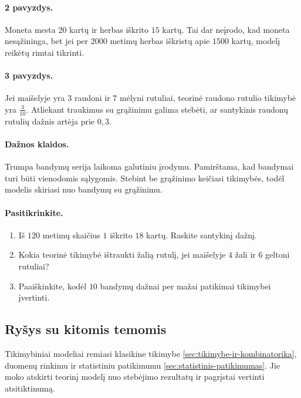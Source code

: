 \paragraph{2 pavyzdys.}
Moneta mesta $20$ kartų ir herbas iškrito $15$ kartų. Tai dar neįrodo, kad moneta nesąžininga, bet jei per $2000$ metimų herbas iškristų apie $1500$ kartų, modelį reikėtų rimtai tikrinti.

\paragraph{3 pavyzdys.}
Jei maišelyje yra $3$ raudoni ir $7$ mėlyni rutuliai, teorinė raudono rutulio tikimybė yra $\frac{3}{10}$. Atliekant traukimus su grąžinimu galima stebėti, ar santykinis raudonų rutulių dažnis artėja prie $0,3$.

\paragraph{Dažnos klaidos.}
Trumpa bandymų serija laikoma galutiniu įrodymu. Pamirštama, kad bandymai turi būti vienodomis sąlygomis. Stebint be grąžinimo keičiasi tikimybės, todėl modelis skiriasi nuo bandymų su grąžinimu.

\paragraph{Pasitikrinkite.}
\begin{enumerate}
\item Iš $120$ metimų skaičius $1$ iškrito $18$ kartų. Raskite santykinį dažnį.
\item Kokia teorinė tikimybė ištraukti žalią rutulį, jei maišelyje $4$ žali ir $6$ geltoni rutuliai?
\item Paaiškinkite, kodėl $10$ bandymų dažnai per mažai patikimai tikimybei įvertinti.
\end{enumerate}

\subsection{Ryšys su kitomis temomis}

Tikimybiniai modeliai remiasi klasikine tikimybe \ref{sec:tikimybe-ir-kombinatorika}, duomenų rinkimu ir statistiniu patikimumu \ref{sec:statistinis-patikimumas}. Jie moko atskirti teorinį modelį nuo stebėjimo rezultatų ir pagrįstai vertinti atsitiktinumą.

